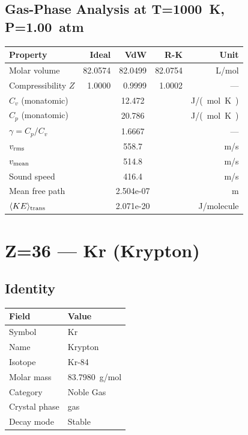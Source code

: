 \documentclass[11pt,a4paper]{article}
\begin{document}
\subsection{Gas-Phase Analysis at T=\SI{1000}{K}, P=\SI{1.00}{atm}}
\begin{tabular}{lrrrr}
  \toprule
  Property & Ideal & VdW & R-K & Unit \\
  \midrule
  Molar volume & 82.0574 & 82.0499 & 82.0754 & \si{L/mol} \\
  Compressibility $Z$ & 1.0000 & 0.9999 & 1.0002 & --- \\
  \midrule
  $C_v$ (monatomic) & \multicolumn{3}{c}{12.472} & \si{J/(mol.K)} \\
  $C_p$ (monatomic) & \multicolumn{3}{c}{20.786} & \si{J/(mol.K)} \\
  $\gamma = C_p/C_v$ & \multicolumn{3}{c}{1.6667} & --- \\
  $v_{\rm rms}$ & \multicolumn{3}{c}{558.7} & \si{m/s} \\
  $v_{\rm mean}$ & \multicolumn{3}{c}{514.8} & \si{m/s} \\
  Sound speed & \multicolumn{3}{c}{416.4} & \si{m/s} \\
  Mean free path & \multicolumn{3}{c}{2.504e-07} & \si{m} \\
  $\langle KE \rangle_{\rm trans}$ & \multicolumn{3}{c}{2.071e-20} & \si{J/molecule} \\
  \bottomrule
\end{tabular}

\newpage

\section{Z=36 --- Kr (Krypton)}
\label{sec:Z36}

\subsection{Identity}
\begin{tabular}{ll}
  \toprule
  Field & Value \\
  \midrule
  Symbol & Kr \\
  Name & Krypton \\
  Isotope & Kr-84 \\
  Molar mass & \SI{83.7980}{g/mol} \\
  Category & Noble Gas \\
  Crystal phase & gas \\
  Decay mode & Stable \\
  \bottomrule
\end{tabular}
\end{document}
